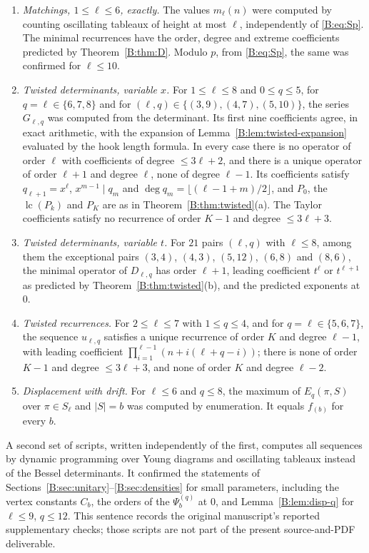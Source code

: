 \documentclass[11pt,a4paper]{article}
\theoremstyle{definition}
\theoremstyle{remark}
\newcommand{\fl}[1]{\lfloor #1\rfloor}
\DeclareMathOperator{\lc}{lc}
\numberwithin{equation}{section}
\begin{document}
\begin{enumerate}
\item \emph{Matchings, $1\le\ell\le6$, exactly.} The values $m_\ell(n)$ were computed by counting oscillating tableaux of height at most $\ell$, independently of \eqref{B:eq:Sp}. The minimal recurrences have the order, degree and extreme coefficients predicted by Theorem~\ref{B:thm:D}. Modulo $p$, from \eqref{B:eq:Sp}, the same was confirmed for $\ell\le10$.
\item \emph{Twisted determinants, variable $x$.} For $1\le\ell\le8$ and $0\le q\le5$, for $q=\ell\in\{6,7,8\}$ and for $(\ell,q)\in\{(3,9),(4,7),(5,10)\}$, the series $G_{\ell,q}$ was computed from the determinant. Its first nine coefficients agree, in exact arithmetic, with the expansion of Lemma~\ref{B:lem:twisted-expansion} evaluated by the hook length formula. In every case there is no operator of order $\ell$ with coefficients of degree $\le3\ell+2$, and there is a unique operator of order $\ell+1$ and degree $\ell$, none of degree $\ell-1$. Its coefficients satisfy $q_{\ell+1}=x^\ell$, $x^{m-1}\mid q_m$ and $\deg q_m=\fl{(\ell-1+m)/2}$, and $P_0$, the $\lc(P_k)$ and $P_K$ are as in Theorem~\ref{B:thm:twisted}(a). The Taylor coefficients satisfy no recurrence of order $K-1$ and degree $\le3\ell+3$.
\item \emph{Twisted determinants, variable $t$.} For $21$ pairs $(\ell,q)$ with $\ell\le8$, among them the exceptional pairs $(3,4)$, $(4,3)$, $(5,12)$, $(6,8)$ and $(8,6)$, the minimal operator of $D_{\ell,q}$ has order $\ell+1$, leading coefficient $t^\ell$ or $t^{\ell+1}$ as predicted by Theorem~\ref{B:thm:twisted}(b), and the predicted exponents at $0$.
\item \emph{Twisted recurrences.} For $2\le\ell\le7$ with $1\le q\le4$, and for $q=\ell\in\{5,6,7\}$, the sequence $u_{\ell,q}$ satisfies a unique recurrence of order $K$ and degree $\ell-1$, with leading coefficient $\prod_{i=1}^{\ell-1}(n+i(\ell+q-i))$; there is none of order $K-1$ and degree $\le3\ell+3$, and none of order $K$ and degree $\ell-2$.
\item \emph{Displacement with drift.} For $\ell\le6$ and $q\le8$, the maximum of $E_q(\pi,S)$ over $\pi\in S_\ell$ and $|S|=b$ was computed by enumeration. It equals $f_{(b)}$ for every $b$.
\end{enumerate}

A second set of scripts, written independently of the first, computes all sequences by dynamic programming over Young diagrams and oscillating tableaux instead of the Bessel determinants. It confirmed the statements of Sections~\ref{B:sec:unitary}--\ref{B:sec:densities} for small parameters, including the vertex constants $C_b$, the orders of the $\Psi^{(q)}_b$ at $0$, and Lemma~\ref{B:lem:disp-q} for $\ell\le9$, $q\le12$. This sentence records the original manuscript's reported supplementary checks; those scripts are not part of the present source-and-PDF deliverable.
\end{document}

